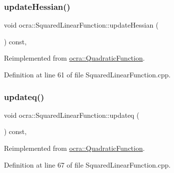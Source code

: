 \subsubsection{\texorpdfstring{update\+Hessian()}{updateHessian()}}
{\footnotesize\ttfamily void ocra\+::\+Squared\+Linear\+Function\+::update\+Hessian (\begin{DoxyParamCaption}{ }\end{DoxyParamCaption}) const\hspace{0.3cm}{\ttfamily [protected]}, {\ttfamily [virtual]}}



Reimplemented from \hyperlink{classocra_1_1QuadraticFunction_a342ea525685ddc2c414a49e7480a7a4c}{ocra\+::\+Quadratic\+Function}.



Definition at line 61 of file Squared\+Linear\+Function.\+cpp.

\hypertarget{classocra_1_1SquaredLinearFunction_a6fec3532febfdea70c28457ea826111e}{}\label{classocra_1_1SquaredLinearFunction_a6fec3532febfdea70c28457ea826111e} 
\subsubsection{\texorpdfstring{updateq()}{updateq()}}
{\footnotesize\ttfamily void ocra\+::\+Squared\+Linear\+Function\+::updateq (\begin{DoxyParamCaption}{ }\end{DoxyParamCaption}) const\hspace{0.3cm}{\ttfamily [protected]}, {\ttfamily [virtual]}}



Reimplemented from \hyperlink{classocra_1_1QuadraticFunction_ae68e94211c94e8c32da2220132baf248}{ocra\+::\+Quadratic\+Function}.



Definition at line 67 of file Squared\+Linear\+Function.\+cpp.

\hypertarget{classocra_1_1SquaredLinearFunction_ab74b479275839850f1c98ac2fa3137bd}{}\label{classocra_1_1SquaredLinearFunction_ab74b479275839850f1c98ac2fa3137bd} 
